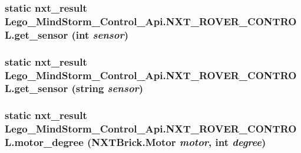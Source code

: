 \hypertarget{class_lego___mind_storm___control___api_1_1_n_x_t___r_o_v_e_r___c_o_n_t_r_o_l_fc928f9206e441cd6ff3c7721a002dd7}{
\subsubsection[{get\_\-sensor}]{\setlength{\rightskip}{0pt plus 5cm}static {\bf nxt\_\-result} Lego\_\-MindStorm\_\-Control\_\-Api.NXT\_\-ROVER\_\-CONTROL.get\_\-sensor (int {\em sensor})}}
\label{class_lego___mind_storm___control___api_1_1_n_x_t___r_o_v_e_r___c_o_n_t_r_o_l_fc928f9206e441cd6ff3c7721a002dd7}


\hypertarget{class_lego___mind_storm___control___api_1_1_n_x_t___r_o_v_e_r___c_o_n_t_r_o_l_1ae3347fa7e0359c7ff85335f6853d9a}{
\subsubsection[{get\_\-sensor}]{\setlength{\rightskip}{0pt plus 5cm}static {\bf nxt\_\-result} Lego\_\-MindStorm\_\-Control\_\-Api.NXT\_\-ROVER\_\-CONTROL.get\_\-sensor (string {\em sensor})}}
\label{class_lego___mind_storm___control___api_1_1_n_x_t___r_o_v_e_r___c_o_n_t_r_o_l_1ae3347fa7e0359c7ff85335f6853d9a}


\hypertarget{class_lego___mind_storm___control___api_1_1_n_x_t___r_o_v_e_r___c_o_n_t_r_o_l_838bd0afb9aa7fc689e7217dafe84e2a}{
\subsubsection[{motor\_\-degree}]{\setlength{\rightskip}{0pt plus 5cm}static {\bf nxt\_\-result} Lego\_\-MindStorm\_\-Control\_\-Api.NXT\_\-ROVER\_\-CONTROL.motor\_\-degree (NXTBrick.Motor {\em motor}, \/  int {\em degree})}}
\label{class_lego___mind_storm___control___api_1_1_n_x_t___r_o_v_e_r___c_o_n_t_r_o_l_838bd0afb9aa7fc689e7217dafe84e2a}


